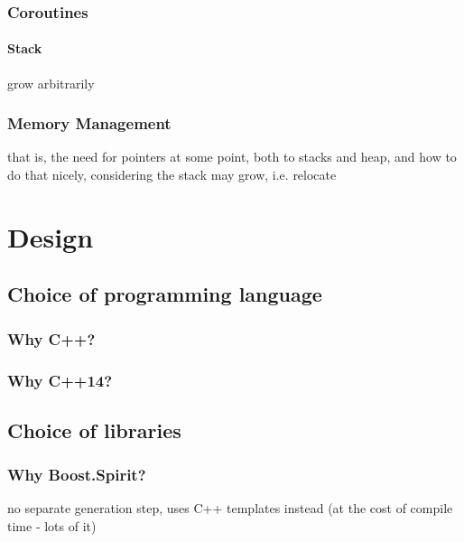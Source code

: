         \subsection{Coroutines}
            
            \subsubsection{Stack}
                
                grow arbitrarily
            
        \subsection{Memory Management}
            
            that is, the need for pointers at some point, both to stacks and heap, and how to do that nicely, considering the stack may grow, i.e. relocate
    

\chapter{Design} %
    \section{Choice of programming language}
        \subsection{Why C++?}
        \subsection{Why C++14?}
    
    \section{Choice of libraries}
        \subsection{Why Boost.Spirit?}
            no separate generation step, uses C++ templates instead (at the cost of compile time - lots of it)
            

